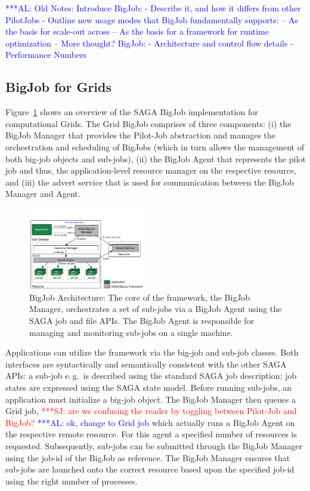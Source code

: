 \documentclass[conference,final]{IEEEtran}
\newcommand{\up}{\vspace*{-1em}}
\newcommand{\alnote}[1]{ {\textcolor{blue} { ***AL: #1 }}}
\newcommand{\jhanote}[1]{ {\textcolor{red} { ***SJ: #1 }}}
\newcommand{\alnote}[1]{}
\newcommand{\jhanote}[1]{}
\begin{document}
\alnote{Old Notes: 
Introduce BigJob:
 - Describe it, and how it differs from other PilotJobs
 - Outline new usage modes that BigJob fundamentally supports:
    -- As the basis for scale-out across
    -- As the basis for a framework for runtime optimization
    -- More thought?
BigJob:
 - Architecture and control flow details
 - Performance Numbers}

\up
\subsection{BigJob for Grids}
\up

Figure~\ref{fig:figures_bigjob} shows an overview of the SAGA BigJob 
implementation for computational Grids. The Grid BigJob comprises 
of three components: (i) the BigJob Manager that
provides the Pilot-Job abstraction and manages the orchestration and
scheduling of BigJobs (which in turn allows the management of both
big-job objects and sub-jobs), (ii) the BigJob Agent that represents the
pilot job and thus, the application-level resource manager on the
respective resource, and (iii) the advert service that is used for
communication between the BigJob Manager and Agent.

\begin{figure}[ht]
    \centering
    \includegraphics[width=0.45\textwidth]{figures/bigjob}
   \caption{BigJob Architecture: The core of the framework, the
      BigJob Manager, orchestrates a set of sub-jobs via a
      BigJob Agent using the SAGA job and file APIs.  The
      BigJob Agent is responsible for managing and monitoring sub-jobs
      on a single machine.}
   \label{fig:figures_bigjob}
\end{figure}

Applications can utilize the framework via the big-job and sub-job
classes. Both interfaces are syntactically and semantically consistent
with the other SAGA APIs: a sub-job e.\,g.\ is described using 
the standard SAGA job description; job states are expressed
using the SAGA state model. Before running sub-jobs, an application must initialize
a big-job object. The BigJob Manager then queues a Grid job,
\jhanote{are we confusing the reader by toggling between Pilot-Job and
  BigJob?} \alnote{ok, change to Grid job} 
which actually runs a BigJob Agent on the respective remote
resource. For this agent a specified number of resources is
requested. Subsequently, sub-jobs can be submitted through the BigJob
Manager using the job-id of the BigJob as reference. The BigJob
Manager ensures that sub-jobs are launched onto the correct
resource based upon the specified job-id using the right number of
processes. 
\end{document}
